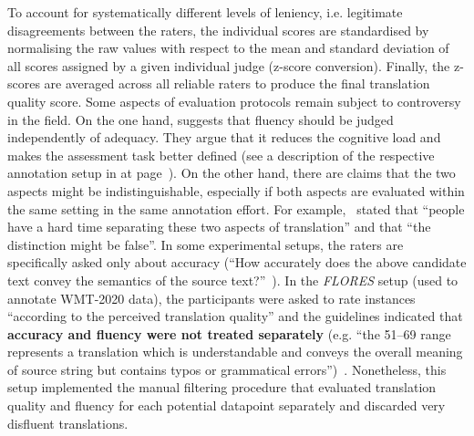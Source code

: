 To account for systematically different levels of leniency, i.e. legitimate disagreements between the raters, the individual scores are standardised by normalising the raw values with respect to the mean and standard deviation of all scores assigned by a given individual judge (z-score conversion). Finally, the z-scores are averaged across all reliable raters to produce the final translation quality score.   
\label{pg:controvercy_over_acc_and_flu}
Some aspects of evaluation protocols remain subject to controversy in the field. On the one hand, \citet{Graham2013, Graham2015} suggests that fluency should be judged independently of adequacy. 
They argue that it reduces the cognitive load and makes the assessment task better defined (see a description of the respective annotation setup in \citet{Daems2013} at page~\pageref{pg:daems_two-stage_errorann}). %
On the other hand, there are claims that the two aspects might be indistinguishable, especially if both aspects are evaluated within the same setting in the same annotation effort. For example,~\citet[p.140]{CallisonBurch2007} stated that ``people have a hard time separating these two aspects of translation'' and that ``the distinction might be false''.
In some experimental setups, the raters are specifically asked only about accuracy (``How accurately does the above candidate text convey the semantics of the source text?''~\cite{Hassan2018}). 
In the \textit{FLORES} setup (used to annotate WMT-2020 data), the participants were asked to rate instances ``according to the perceived translation quality'' and the guidelines indicated that \textbf{accuracy and fluency were not treated separately} (e.g. ``the 51--69 range represents a translation which is understandable and conveys the overall meaning of source string but contains typos or grammatical errors'')~\cite[p.6109]{Guzman2019}. Nonetheless, this setup implemented the manual filtering procedure that evaluated translation quality and fluency for each potential datapoint separately and discarded very disfluent translations. 
